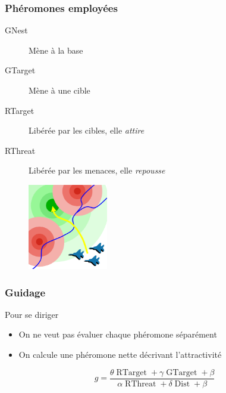 \documentclass{beamer}
\begin{document}
\begin{frame}

  \frametitle{Phéromones employées}

  \begin{description}
  \item[GNest]{Mène à la base}
  \item[GTarget]{Mène à une cible}
  \item[RTarget]{Libérée par les cibles, elle \textit{attire}}
  \item[RThreat]{Libérée par les menaces, elle \textit{repousse}}
  \end{description}

  \vfill

  \begin{figure}
    \centering
    \includegraphics[width=3.5cm]{terrain_field.png}
  \end{figure}

\end{frame}

\begin{frame}

  \frametitle{Guidage}

  \begin{block}{Pour se diriger}
    \begin{itemize}
    \item{On ne veut pas évaluer chaque phéromone séparément}
    \item{On calcule une phéromone nette décrivant l'attractivité}
    \end{itemize}
  \end{block}

  \vfill

  $$g = \frac{ \theta \operatorname{RTarget} + \gamma \operatorname{GTarget} + \beta}{\alpha \operatorname{RThreat} + \delta \operatorname{Dist} + \beta}$$

\end{frame}
\end{document}
